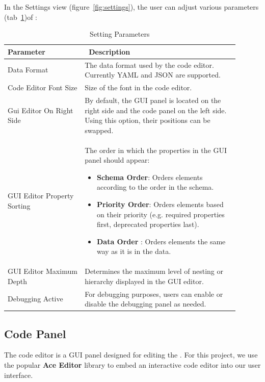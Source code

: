 In the Settings view (figure~\ref{fig:settings}), the user can adjust various parameters (tab~\ref{tab:settings})of \toolname{}:
\begin{table}
    \centering
    \caption{Setting Parameters\label{tab:settings}}
    \begin{tabular}{@{}p{0.3\linewidth}p{0.6\linewidth}@{}}
        \toprule
        \textbf{Parameter} & \textbf{\ Description} \\
        \midrule
        Data Format & The data format used by the code editor. Currently YAML and JSON are supported. \\
        Code Editor Font Size & Size of the font in the code editor. \\
        Gui Editor On Right Side & By default, the GUI panel is located on the right side and the code panel on the left side. Using this option, their positions can be swapped. \\
        GUI Editor Property Sorting & The order in which the properties in the GUI panel should appear:
        \begin{itemize}
            \item \textbf{Schema Order}: Orders elements according to the order in the schema.
            \item \textbf{Priority Order}: Orders elements based on their priority (e.g. required properties first, deprecated properties last).
            \item \textbf{Data Order }: Orders elements the same way as it is in the data.
        \end{itemize} \\
        GUI Editor Maximum Depth & Determines the maximum level of nesting or hierarchy displayed in the GUI editor. \\
        Debugging Active & For debugging purposes, users can enable or disable the debugging panel as needed.  \\
        \bottomrule
    \end{tabular}
\end{table}


\subsection{Code Panel}\label{subsec:code-editor}

The code editor is a GUI panel designed for editing the \cfgfiles.
For this project, we use the popular \textbf{Ace Editor}\cite{Ace-Editor} library to embed an interactive code editor into our user interface.

